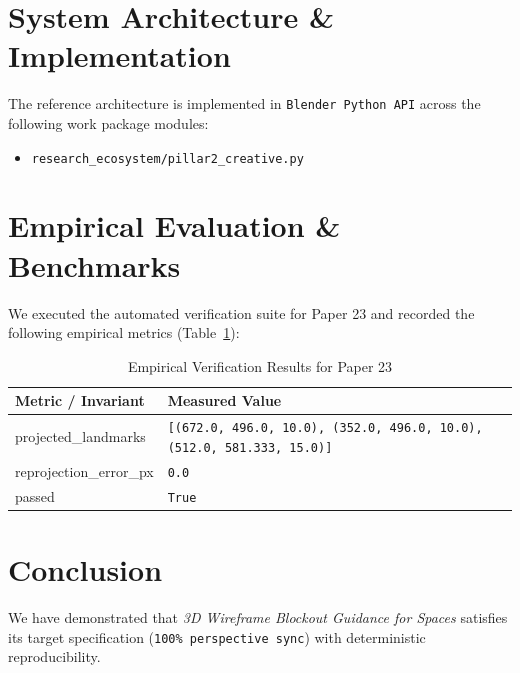 \documentclass[10pt,twocolumn]{article}
\begin{document}
\section{System Architecture \& Implementation}
The reference architecture is implemented in \texttt{Blender Python API} across the following work package modules:
\begin{itemize}
  \item \texttt{research\_ecosystem/pillar2\_creative.py}
\end{itemize}

\section{Empirical Evaluation \& Benchmarks}
We executed the automated verification suite for Paper 23 and recorded the following empirical metrics (Table~\ref{tab:metrics}):

\begin{table}[htbp]
\centering
\caption{Empirical Verification Results for Paper 23}
\label{tab:metrics}
\begin{tabular}{ll}
\toprule
\textbf{Metric / Invariant} & \textbf{Measured Value} \\
\midrule
    projected\_landmarks & \texttt{[(672.0, 496.0, 10.0), (352.0, 496.0, 10.0), (512.0, 581.333, 15.0)]} \\
    reprojection\_error\_px & \texttt{0.0} \\
    passed & \texttt{True} \\
\bottomrule
\end{tabular}
\end{table}

\section{Conclusion}
We have demonstrated that \textit{3D Wireframe Blockout Guidance for Spaces} satisfies its target specification (\texttt{100\% perspective sync}) with deterministic reproducibility.



\end{document}
